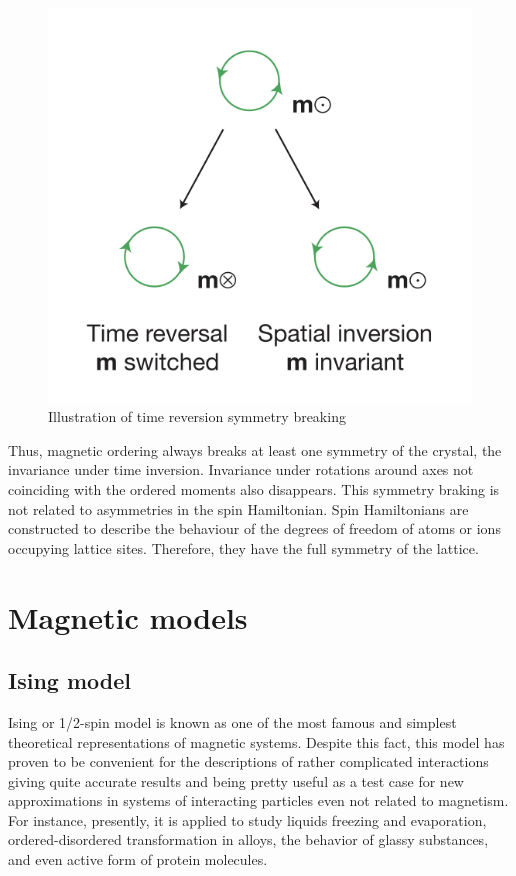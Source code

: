 \begin{figure}[H]
	\centering
	\includegraphics{fig/review/time_reverse.png}
	\caption[Illustration of time reversion symmetry breaking]{Illustration of time reversion symmetry breaking \cite{eerenstein2006multiferroic}}
\label{fig:time_reverse}
\end{figure}

Thus, magnetic ordering always breaks at least one symmetry of the crystal, the invariance under time inversion. Invariance under rotations around axes not coinciding with the ordered moments also disappears. This symmetry braking is not related to asymmetries in the spin Hamiltonian.
Spin Hamiltonians are constructed to describe the behaviour of the degrees of freedom of atoms or ions occupying lattice sites.
Therefore, they have the full symmetry of the lattice.


\section{Magnetic models}\label{section: Magnetic models}

\subsection{Ising model}
Ising or 1/2-spin model is known as one of the most famous and simplest theoretical representations of magnetic systems. Despite this fact, this model has proven to be convenient for the descriptions of rather complicated interactions giving quite accurate results and being pretty useful as a test case for new approximations in systems of interacting particles even not related to magnetism.  For instance, presently, it is applied to study liquids freezing and evaporation, ordered-disordered transformation in alloys, the behavior of glassy substances, and even active form of protein molecules.


